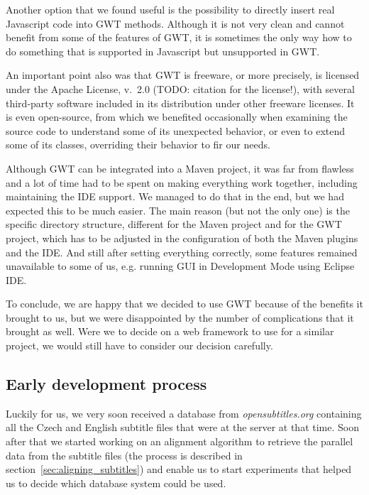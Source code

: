 Another option that we found useful is the possibility to directly insert real Javascript code into GWT methods. Although it is not very clean and cannot benefit from some of the features of GWT, it is sometimes the only way how to do something that is supported in Javascript but unsupported in GWT.

An important point also was that GWT is freeware, or more precisely, is licensed under the Apache License, v.~2.0 (TODO: citation for the license!), with several third-party software included in its distribution under other freeware licenses. It is even open-source, from which we benefited occasionally when examining the source code to understand some of its unexpected behavior, or even to extend some of its classes, overriding their behavior to fir our needs.

Although GWT can be integrated into a Maven project, it was far from flawless and a lot of time had to be spent on making everything work together, including maintaining the IDE support. We managed to do that in the end, but we had expected this to be much easier. The main reason (but not the only one) is the specific directory structure, different for the Maven project and for the GWT project, which has to be adjusted in the configuration of both the Maven plugins and the IDE.
And still after setting everything correctly, some features remained unavailable to some of us, e.g. running GUI in Development Mode using Eclipse IDE.

To conclude, we are happy that we decided to use GWT because of the benefits it brought to us, but we were disappointed by the number of complications that it brought as well. Were we to decide on a web framework to use for a similar project, we would still have to consider our decision carefully.

\subsection{Early development process}

Luckily for us, we very soon received a database from {\it opensubtitles.org} containing all the Czech and English subtitle files that were at the server at that time. Soon after that we started working on an alignment algorithm to retrieve the parallel data from the subtitle files (the process is described in section~\ref{sec:aligning_subtitles}) and enable us to start experiments that helped us to decide which database system could be used.


